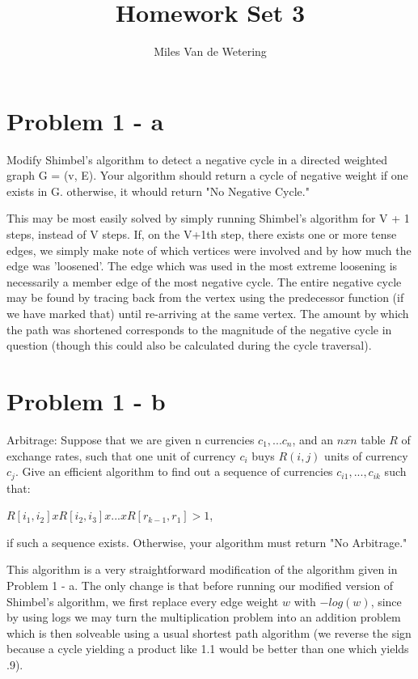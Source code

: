 \documentclass[]{report}
\title{Homework Set 3}
\author{Miles Van de Wetering}
\begin{document}
\maketitle

\section*{Problem 1 - a}
Modify Shimbel's algorithm to detect a negative cycle in a directed weighted graph G = (v, E). Your algorithm should return a cycle of negative weight if one exists in G. otherwise, it whould return "No Negative Cycle."

This may be most easily solved by simply running Shimbel's algorithm for V + 1 steps, instead of V steps. If, on the V+1th step, there exists one or more tense edges, we simply make note of which vertices were involved and by how much the edge was 'loosened'. The edge which was used in the most extreme loosening is necessarily a member edge of the most negative cycle. The entire negative cycle may be found by tracing back from the vertex using the predecessor function (if we have marked that) until re-arriving at the same vertex. The amount by which the path was shortened corresponds to the magnitude of the negative cycle in question (though this could also be calculated during the cycle traversal).

\section*{Problem 1 - b}
Arbitrage:
Suppose that we are given n currencies $c_1, ... c_n$, and an $n x n$ table $R$ of exchange rates, such that one unit of currency $c_i$ buys $R(i, j)$ units of currency $c_j$. Give an efficient algorithm to find out a sequence of currencies $c_{i1}, ..., c_{ik}$ such that:

	$R[i_1, i_2] x R[i_2, i_3] x ... x R[r_{k-1}, r_1] > 1$,

if such a sequence exists. Otherwise, your algorithm must return "No Arbitrage."

This algorithm is a very straightforward modification of the algorithm given in Problem 1 - a. The only change is that before running our modified version of Shimbel's algorithm, we first replace every edge weight $w$ with $-log(w)$, since by using logs we may turn the multiplication problem into an addition problem which is then solveable using a usual shortest path algorithm (we reverse the sign because a cycle yielding a product like 1.1 would be better than one which yields .9).
\end{document}
